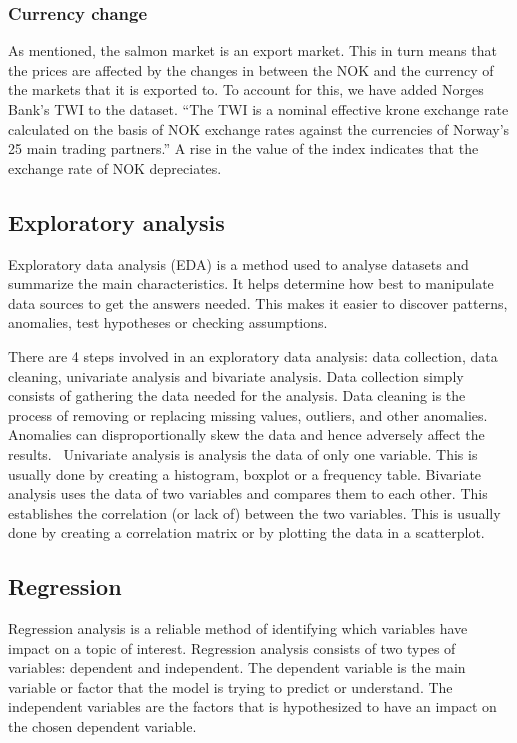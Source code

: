 \subsubsection{Currency change}\label{Currency change}
As mentioned, the salmon market is an export market. This in turn means that the prices are affected by the changes in between the NOK and the currency of the markets that it is exported to. To account for this, we have added Norges Bank's TWI to the dataset. ``The TWI is a nominal effective krone exchange rate calculated on the basis of NOK exchange rates against the currencies of Norway's 25 main trading partners.'' \parencite{norges_bank_2020} A rise in the value of the index indicates that the exchange rate of NOK depreciates.

\subsection{Exploratory analysis}
Exploratory data analysis (EDA) is a method used to analyse datasets and summarize the main characteristics. It helps determine how best to manipulate data sources to get the answers needed. This makes it easier to discover patterns, anomalies, test hypotheses or checking assumptions. 

There are 4 steps involved in an exploratory data analysis: data collection, data cleaning, univariate analysis and bivariate analysis. 
Data collection simply consists of gathering the data needed for the analysis. 
Data cleaning is the process of removing or replacing missing values, outliers, and other anomalies. Anomalies can disproportionally skew the data and hence adversely affect the results.~\parencite{biswal_2023}
Univariate analysis is analysis the data of only one variable. This is usually done by creating a histogram, boxplot or a frequency table.  
Bivariate analysis uses the data of two variables and compares them to each other. This establishes the correlation (or lack of) between the two variables. This is usually done by creating a correlation matrix or by plotting the data in a scatterplot. 

\subsection{Regression}
Regression analysis is a reliable method of identifying which variables have impact on a topic of interest. Regression analysis consists of two types of variables: dependent and independent. The dependent variable is the main variable or factor that the model is trying to predict or understand. The independent variables are the factors that is hypothesized to have an impact on the chosen dependent variable. 

